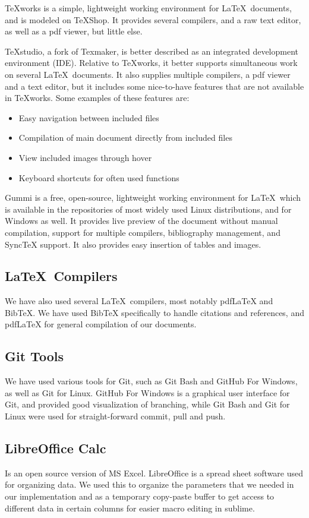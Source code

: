 TeXworks is a simple, lightweight working environment for \LaTeX \ documents, and is modeled on TeXShop. It provides several compilers, and a raw text editor, as well as a pdf viewer, but little else.

TeXstudio, a fork of Texmaker, is better described as an integrated development environment (IDE). Relative to TeXworks, it better supports simultaneous work on several \LaTeX \ documents. It also supplies multiple compilers, a pdf viewer and a text editor, but it includes some nice-to-have features that are not available in TeXworks. Some examples of these features are:
\begin{itemize}
\item Easy navigation between included files
\item Compilation of main document directly from included files
\item View included images through hover
\item Keyboard shortcuts for often used functions
\end{itemize}

Gummi is a free, open-source, lightweight working environment for \LaTeX \ which is available in the repositories of most widely used Linux distributions, and for Windows as well. It provides live preview of the document without manual compilation, support for multiple compilers, bibliography management, and SyncTeX support. It also provides easy insertion of tables and images.

\subsection{\LaTeX \ Compilers}
We have also used several \LaTeX \ compilers, most notably pdfLaTeX and BibTeX. We have used BibTeX specifically to handle citations and references, and pdfLaTeX for general compilation of our documents.

\subsection{Git Tools}
We have used various tools for Git, such as Git Bash and GitHub For Windows, as well as Git for Linux. GitHub For Windows is a graphical user interface for Git, and provided good visualization of branching, while Git Bash and Git for Linux were used for straight-forward commit, pull and push.

\subsection{LibreOffice Calc}
Is an open source version of MS Excel. LibreOffice is a spread sheet software used for organizing data. We used this to organize the parameters that we needed in our implementation and as a temporary copy-paste buffer to get access to different data in certain columns for easier macro editing in sublime.

